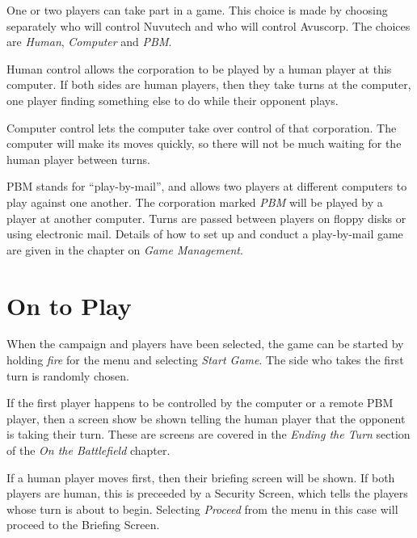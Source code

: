 \noindent
One or two players can take part in a game. This choice is made by choosing separately who will control Nuvutech and who will control Avuscorp. The choices are {\it Human}, {\it Computer} and {\it PBM}.

Human control allows the corporation to be played by a human player at this computer. If both sides are human players, then they take turns at the computer, one player finding something else to do while their opponent plays.

Computer control lets the computer take over control of that corporation. The computer will make its moves quickly, so there will not be much waiting for the human player between turns.

PBM stands for ``play-by-mail'', and allows two players at different computers to play against one another. The corporation marked {\it PBM} will be played by a player at another computer. Turns are passed between players on floppy disks or using electronic mail. Details of how to set up and conduct a play-by-mail game are given in the chapter on {\it Game Management}.

\section{On to Play}

\noindent
When the campaign and players have been selected, the game can be started by holding {\it fire} for the menu and selecting {\it Start Game}. The side who takes the first turn is randomly chosen.

If the first player happens to be controlled by the computer or a remote PBM player, then a screen show be shown telling the human player that the opponent is taking their turn. These are screens are covered in the {\it Ending the Turn} section of the {\it On the Battlefield} chapter.

If a human player moves first, then their briefing screen will be shown. If both players are human, this is preceeded by a Security Screen, which tells the players whose turn is about to begin. Selecting {\it Proceed} from the menu in this case will proceed to the Briefing Screen.
